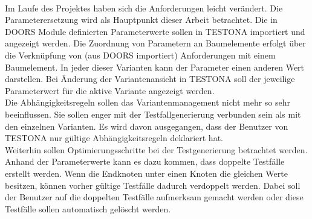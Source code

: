 \paragraph{}

Im Laufe des Projektes haben sich die Anforderungen leicht verändert. Die Parameterersetzung wird als Hauptpunkt dieser Arbeit betrachtet. Die in DOORS Module definierten Parameterwerte sollen in TESTONA importiert und angezeigt werden. Die Zuordnung von Parametern an Baumelemente erfolgt über die Verknüpfung von (aus DOORS importiert) Anforderungen mit einem Baumelement. In jeder dieser Varianten kann der Parameter einen anderen Wert darstellen. Bei Änderung der Variantenansicht in TESTONA soll der jeweilige Parameterwert für die aktive Variante angezeigt werden.\\


Die Abhängigkeitsregeln sollen das Variantenmanagement nicht mehr so sehr beeinflussen. Sie  sollen  enger mit der Testfallgenerierung verbunden sein als mit den einzelnen Varianten. Es wird davon ausgegangen, dass der Benutzer von TESTONA nur gültige Abhängigkeitsregeln deklariert hat.\\


Weiterhin sollen Optimierungsschritte bei der Testgenerierung betrachtet werden. Anhand der Parameterwerte kann es dazu kommen, dass doppelte Testfälle erstellt werden. Wenn die Endknoten unter einen Knoten die gleichen Werte besitzen, können vorher gültige Testfälle dadurch verdoppelt werden. Dabei soll der Benutzer auf die doppelten Testfälle aufmerksam gemacht werden oder diese Testfälle sollen automatisch gelöscht werden.